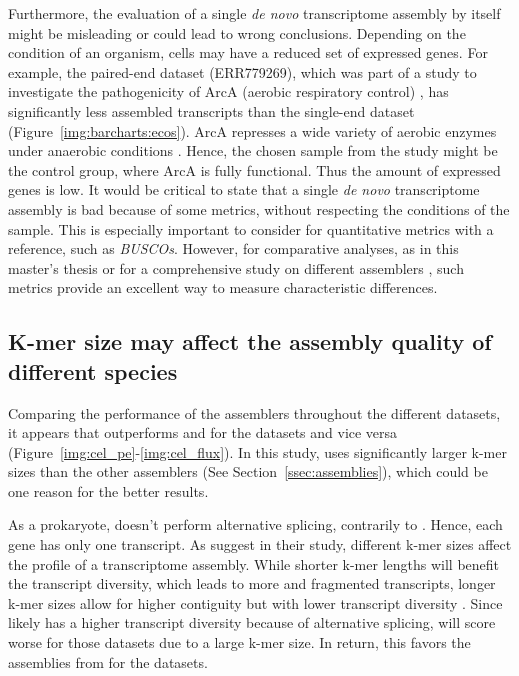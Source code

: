 \documentclass[12pt,a4paper,english]{article}
\begin{document}
		Furthermore, the evaluation of a single \textit{de novo} transcriptome assembly by itself might be misleading or could lead to wrong conclusions.
		Depending on the condition of an organism, cells may have a reduced set of expressed genes.
		For example, the paired-end \ecoli dataset (ERR779269), which was part of a study to investigate the pathogenicity of ArcA (aerobic respiratory control) \citep{arca_study:15}, has significantly less assembled transcripts than the single-end \ecoli dataset (Figure~\ref{img:barcharts:ecos}).
		ArcA represses a wide variety of aerobic enzymes under anaerobic conditions \citep{arca_function:88}.
		Hence, the chosen sample from the study might be the control group, where ArcA is fully functional. Thus the amount of expressed genes is low.
		It would be critical to state that a single \textit{de novo} transcriptome assembly is bad because of some metrics, without respecting the conditions of the sample. This is especially important to consider for quantitative metrics with a reference, such as \textit{BUSCOs}.
		However, for comparative analyses, as in this master's thesis or for a comprehensive study on different assemblers \citep{hoelzer:19}, such metrics provide an excellent way to measure characteristic differences.

	\subsection{K-mer size may affect the assembly quality of different species}
	    Comparing the performance of the assemblers throughout the different datasets, it appears that \soap outperforms \spades and \trinity for the \ecoli datasets and vice versa (Figure~\ref{img:cel_pe}-\ref{img:cel_flux}).
		In this study, \soap uses significantly larger k-mer sizes than the other assemblers (See Section~\ref{ssec:assemblies}), which could be one reason for the better results.
		
		As a prokaryote, \ecoli doesn't perform alternative splicing, contrarily to \celegans \citep{celegans_splicing:17}. Hence, each gene has only one transcript.
		As \citeauthor{optimization:10} \citep{optimization:10} suggest in their study, different k-mer sizes affect the profile of a transcriptome assembly.
		While shorter k-mer lengths will benefit the transcript diversity, which leads to more and fragmented transcripts, longer k-mer sizes allow for higher contiguity but with lower transcript diversity \citep{optimization:10}.
		Since \celegans likely has a higher transcript diversity because of alternative splicing, \soap will score worse for those datasets due to a large k-mer size. In return, this favors the assemblies from \soap for the \ecoli datasets.
		
\end{document}
